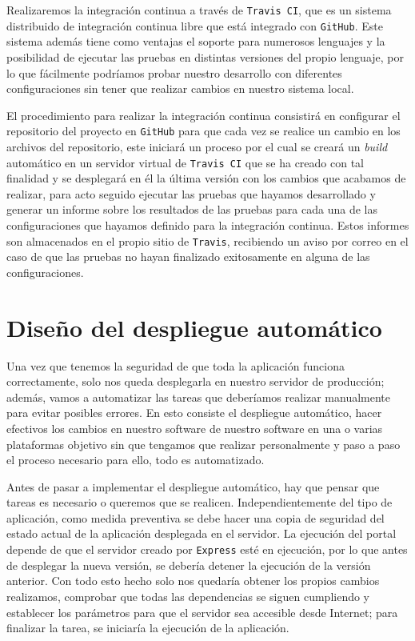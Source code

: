 \bigskip
Realizaremos la integración continua a través de {\tt Travis CI}, que es un sistema distribuido de integración continua libre que está integrado con {\tt GitHub}. Este sistema además tiene como ventajas el soporte para numerosos lenguajes y la posibilidad de ejecutar las pruebas en distintas versiones del propio lenguaje, por lo que fácilmente podríamos probar nuestro desarrollo con diferentes configuraciones sin tener que realizar cambios en nuestro sistema local.

\bigskip
El procedimiento para realizar la integración continua consistirá en configurar el repositorio del proyecto en {\tt GitHub} para que cada vez se realice un cambio en los archivos del repositorio, este iniciará un proceso por el cual se creará un \textit{build} automático en un servidor virtual de {\tt Travis CI} que se ha creado con tal finalidad y se desplegará en él la última versión con los cambios que acabamos de realizar, para acto seguido ejecutar las pruebas que hayamos desarrollado y generar un informe sobre los resultados de las pruebas para cada una de las configuraciones que hayamos definido para la integración continua. Estos informes son almacenados en el propio sitio de {\tt Travis}, recibiendo un aviso por correo en el caso de que las pruebas no hayan finalizado exitosamente en alguna de las configuraciones.

\section{Diseño del despliegue automático}

Una vez que tenemos la seguridad de que toda la aplicación funciona correctamente, solo nos queda desplegarla en nuestro servidor de producción; además, vamos a automatizar las tareas que deberíamos realizar manualmente para evitar posibles errores. En esto consiste el despliegue automático, hacer efectivos los cambios en nuestro software de nuestro software en una o varias plataformas objetivo sin que tengamos que realizar personalmente y paso a paso el proceso necesario para ello, todo es 
automatizado.

\bigskip
Antes de pasar a implementar el despliegue automático, hay que pensar que tareas es necesario o queremos que se realicen. Independientemente del tipo de aplicación, como medida preventiva se debe hacer una copia de seguridad del estado actual de la aplicación desplegada en el servidor. La ejecución del portal depende de que el servidor creado por {\tt Express} esté en  ejecución, por lo que antes de desplegar la nueva versión, se debería detener la ejecución de la versión anterior. Con todo esto hecho solo nos quedaría obtener los propios cambios realizamos, comprobar que todas las dependencias se siguen cumpliendo y  establecer los parámetros para que el servidor sea accesible desde Internet; para finalizar la tarea, se iniciaría la ejecución de la aplicación.

